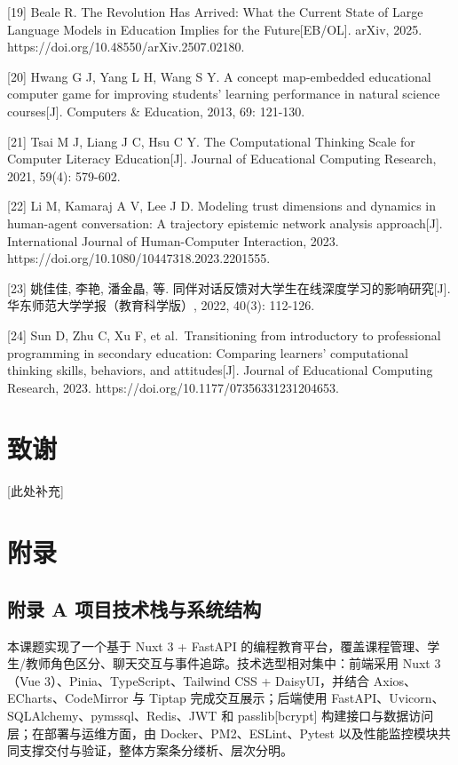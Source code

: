 {[}19{]} Beale R. The Revolution Has Arrived: What the Current State of Large Language Models in Education Implies for the Future{[}EB/OL{]}. arXiv, 2025. https://doi.org/10.48550/arXiv.2507.02180.

{[}20{]} Hwang G J, Yang L H, Wang S Y. A concept map-embedded educational computer game for improving students' learning performance in natural science courses{[}J{]}. Computers \& Education, 2013, 69: 121-130.

{[}21{]} Tsai M J, Liang J C, Hsu C Y. The Computational Thinking Scale for Computer Literacy Education{[}J{]}. Journal of Educational Computing Research, 2021, 59(4): 579-602.

{[}22{]} Li M, Kamaraj A V, Lee J D. Modeling trust dimensions and dynamics in human-agent conversation: A trajectory epistemic network analysis approach{[}J{]}. International Journal of Human-Computer Interaction, 2023. https://doi.org/10.1080/10447318.2023.2201555.

{[}23{]} 姚佳佳, 李艳, 潘金晶, 等. 同伴对话反馈对大学生在线深度学习的影响研究{[}J{]}. 华东师范大学学报（教育科学版）, 2022, 40(3): 112-126.

{[}24{]} Sun D, Zhu C, Xu F, et al.~Transitioning from introductory to professional programming in secondary education: Comparing learners' computational thinking skills, behaviors, and attitudes{[}J{]}. Journal of Educational Computing Research, 2023. https://doi.org/10.1177/07356331231204653.

\chapter*{致谢}\label{ux81f4ux8c22}

{[}此处补充{]}

\appendix\chapter{附录}\label{ux9644ux5f55}

\section{附录 A 项目技术栈与系统结构}\label{ux9644ux5f55-a-ux9879ux76eeux6280ux672fux6808ux4e0eux7cfbux7edfux7ed3ux6784}

本课题实现了一个基于 Nuxt 3 + FastAPI 的编程教育平台，覆盖课程管理、学生/教师角色区分、聊天交互与事件追踪。技术选型相对集中：前端采用 Nuxt 3（Vue 3）、Pinia、TypeScript、Tailwind CSS + DaisyUI，并结合 Axios、ECharts、CodeMirror 与 Tiptap 完成交互展示；后端使用 FastAPI、Uvicorn、SQLAlchemy、pymssql、Redis、JWT 和 passlib[bcrypt] 构建接口与数据访问层；在部署与运维方面，由 Docker、PM2、ESLint、Pytest 以及性能监控模块共同支撑交付与验证，整体方案条分缕析、层次分明。

